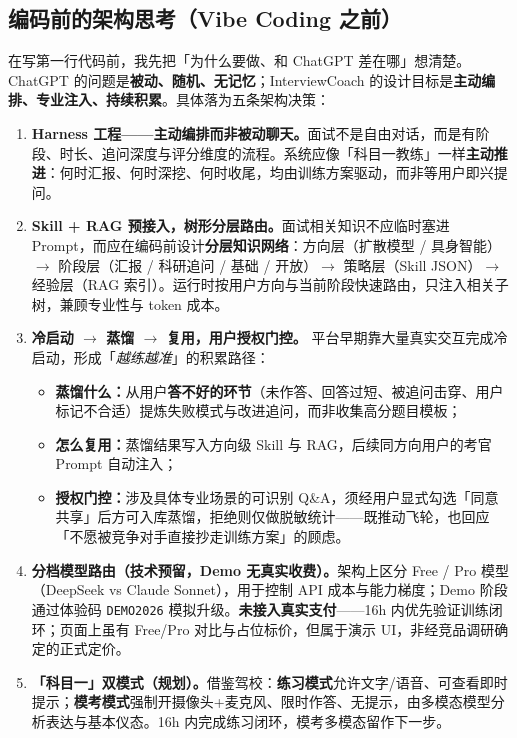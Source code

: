 \documentclass[11pt, a4paper]{article}
\begin{document}
\subsection{编码前的架构思考（Vibe Coding 之前）}

在写第一行代码前，我先把「为什么要做、和 ChatGPT 差在哪」想清楚。ChatGPT 的问题是\textbf{被动、随机、无记忆}；InterviewCoach 的设计目标是\textbf{主动编排、专业注入、持续积累}。具体落为五条架构决策：

\begin{enumerate}
  \item \textbf{Harness 工程——主动编排而非被动聊天。}面试不是自由对话，而是有阶段、时长、追问深度与评分维度的流程。系统应像「科目一教练」一样\textbf{主动推进}：何时汇报、何时深挖、何时收尾，均由训练方案驱动，而非等用户即兴提问。

  \item \textbf{Skill + RAG 预接入，树形分层路由。}面试相关知识不应临时塞进 Prompt，而应在编码前设计\textbf{分层知识网络}：方向层（扩散模型 / 具身智能）$\to$ 阶段层（汇报 / 科研追问 / 基础 / 开放）$\to$ 策略层（Skill JSON）$\to$ 经验层（RAG 索引）。运行时按用户方向与当前阶段快速路由，只注入相关子树，兼顾专业性与 token 成本。

  \item \textbf{冷启动 $\to$ 蒸馏 $\to$ 复用，用户授权门控。}
  平台早期靠大量真实交互完成冷启动，形成「\emph{越练越准}」的积累路径：
  \begin{itemize}[topsep=2pt, itemsep=1pt]
    \item \textbf{蒸馏什么：}从用户\textbf{答不好的环节}（未作答、回答过短、被追问击穿、用户标记不合适）提炼失败模式与改进追问，而非收集高分题目模板；
    \item \textbf{怎么复用：}蒸馏结果写入方向级 Skill 与 RAG，后续同方向用户的考官 Prompt 自动注入；
    \item \textbf{授权门控：}涉及具体专业场景的可识别 Q\&A，须经用户显式勾选「同意共享」后方可入库蒸馏，拒绝则仅做脱敏统计——既推动飞轮，也回应「不愿被竞争对手直接抄走训练方案」的顾虑。
  \end{itemize}

  \item \textbf{分档模型路由（技术预留，Demo 无真实收费）。}架构上区分 Free / Pro 模型（DeepSeek vs Claude Sonnet），用于控制 API 成本与能力梯度；Demo 阶段通过体验码 \texttt{DEMO2026} 模拟升级。\textbf{未接入真实支付}——16h 内优先验证训练闭环；页面上虽有 Free/Pro 对比与占位标价，但属于演示 UI，非经竞品调研确定的正式定价。

  \item \textbf{「科目一」双模式（规划）。}借鉴驾校：\textbf{练习模式}允许文字/语音、可查看即时提示；\textbf{模考模式}强制开摄像头+麦克风、限时作答、无提示，由多模态模型分析表达与基本仪态。16h 内完成练习闭环，模考多模态留作下一步。
\end{enumerate}
\end{document}
